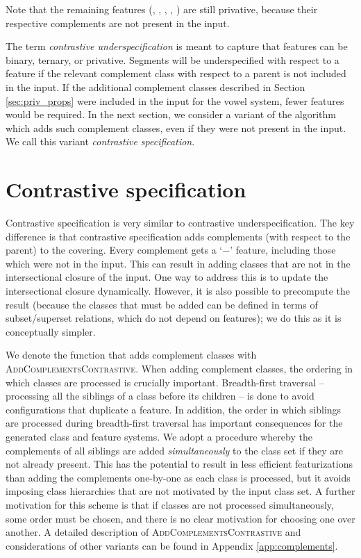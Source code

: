 \documentclass[11pt, oneside]{article}   	%
\begin{document}
Note that the remaining features (, , , , ) are still privative, because their respective complements are not present in the input.

The term \textit{contrastive underspecification} is meant to capture that features can be binary, ternary, or privative. Segments will be underspecified with respect to a feature if the relevant complement class with respect to a parent is not included in the input. If the additional complement classes described in Section \ref{sec:priv_props} were included in the input for the vowel system, fewer features would be required. In the next section, we consider a variant of the algorithm which adds such complement classes, even if they were not present in the input. We call this variant \textit{contrastive specification}.

\FloatBarrier
\section{Contrastive specification}
\label{sec:contrastive}

Contrastive specification is very similar to contrastive underspecification. The key difference is that contrastive specification adds complements (with respect to the parent) to the covering. Every complement gets a `$-$' feature, including those which were not in the input. This can result in adding classes that are not in the intersectional closure of the input. One way to address this is to update the intersectional closure dynamically. However, it is also possible to precompute the result (because the classes that must be added can be defined in terms of subset/superset relations, which do not depend on features); we do this as it is conceptually simpler.

We denote the function that adds complement classes with \textsc{AddComplementsContrastive}. When adding complement classes, the ordering in which classes are processed is crucially important. Breadth-first traversal -- processing all the siblings of a class before its children -- is done to avoid configurations that duplicate a feature. In addition, the order in which siblings are processed during breadth-first traversal has important consequences for the generated class and feature systems. We adopt a procedure whereby the complements of all siblings are added \textit{simultaneously} to the class set if they are not already present. This has the potential to result in less efficient featurizations than adding the complements one-by-one as each class is processed, but it avoids imposing class hierarchies that are not motivated by the input class set. A further motivation for this scheme is that if classes are not processed simultaneously, some order must be chosen, and there is no clear motivation for choosing one over another. A detailed description of \textsc{AddComplementsContrastive} and considerations of other variants can be found in Appendix \ref{app:complements}.
\end{document}
